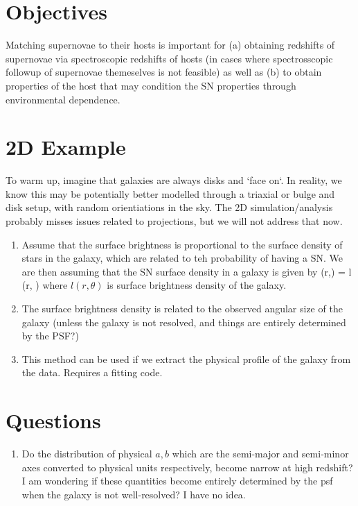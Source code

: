 \documentclass{article}
\begin{document}
\section{Objectives}
Matching supernovae to their hosts is important for (a) obtaining redshifts of 
supernovae via spectroscopic redshifts of hosts (in cases where spectrosscopic
followup of supernovae themeselves is not feasible) as well as (b) to obtain 
properties of the host that may condition the SN properties through 
environmental dependence.


\section{2D Example}
To warm up, imagine that galaxies are always disks and `face on`. In reality, we know this may be potentially better modelled through a triaxial or bulge and disk setup, with random orientiations in the sky. The 2D simulation/analysis probably misses issues related to projections, but we will not address that now.
\begin{enumerate}
\item Assume that the surface brightness is proportional to the surface density of stars in the galaxy, which are related to teh probability of having a SN. We are then assuming that the SN surface density in a galaxy is given by 
    \be
    \sigma(r,\theta) = l (r, \theta) 
    \ee
    where $l(r, \theta)$ is surface brightness density of the galaxy.
\item The surface brightness density is related to the observed angular size of the galaxy (unless the galaxy is not resolved, and things are entirely determined by the PSF?) 
\item This method can be used if we extract the physical profile of the galaxy 
    from the data. Requires a fitting code. 
\end{enumerate}
\section{Questions}
\begin{enumerate}
    \item Do the distribution of physical $a, b$ which are the semi-major and semi-minor axes converted to physical units respectively, become narrow at high redshift? I am wondering if these quantities become entirely determined by the psf when the galaxy is not well-resolved? I have no idea.
\end{enumerate}
\end{document}
